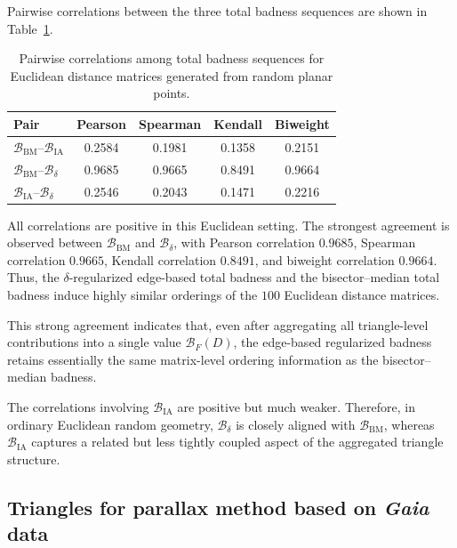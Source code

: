 \documentclass[11pt]{article}
\begin{document}
Pairwise correlations between the three total badness sequences are shown in Table~\ref{tab:euclidean_random_points_corr}.

\begin{table}[h!]
\centering
\caption{Pairwise correlations among total badness sequences for Euclidean distance matrices generated from random planar points.}
\label{tab:euclidean_random_points_corr}
\small
\setlength{\tabcolsep}{7pt}
\begin{tabular}{lcccc}
\hline
Pair & Pearson & Spearman & Kendall & Biweight \\
\hline
\(\mathcal{B}_{\mathrm{BM}}\)--\(\mathcal{B}_{\mathrm{IA}}\)     & 0.2584 & 0.1981 & 0.1358 & 0.2151 \\
\(\mathcal{B}_{\mathrm{BM}}\)--\(\mathcal{B}_{\delta}\)          & 0.9685 & 0.9665 & 0.8491 & 0.9664 \\
\(\mathcal{B}_{\mathrm{IA}}\)--\(\mathcal{B}_{\delta}\)          & 0.2546 & 0.2043 & 0.1471 & 0.2216 \\
\hline
\end{tabular}
\end{table}

All correlations are positive in this Euclidean setting. The strongest agreement is observed between \(\mathcal{B}_{\mathrm{BM}}\) and \(\mathcal{B}_{\delta}\), with Pearson correlation \(0.9685\), Spearman correlation \(0.9665\), Kendall correlation \(0.8491\), and biweight correlation \(0.9664\). Thus, the \(\delta\)-regularized edge-based total badness and the bisector--median total badness induce highly similar orderings of the \(100\) Euclidean distance matrices.

This strong agreement indicates that, even after aggregating all triangle-level contributions into a single value \(\mathcal{B}_{F}(D)\), the edge-based regularized badness retains essentially the same matrix-level ordering information as the bisector--median badness.

The correlations involving \(\mathcal{B}_{\mathrm{IA}}\) are positive but much weaker. Therefore, in ordinary Euclidean random geometry, \(\mathcal{B}_{\delta}\) is closely aligned with \(\mathcal{B}_{\mathrm{BM}}\), whereas \(\mathcal{B}_{\mathrm{IA}}\) captures a related but less tightly coupled aspect of the aggregated triangle structure.

\subsection{Triangles for parallax method based on \textit{Gaia} data}
\label{sec:Gaia_correlation}
\end{document}
